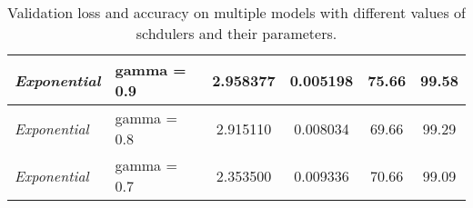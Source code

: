 {\begin{table}[h]
\begin{tabular}{|l|l|cc|cc|}
\textit{Exponential} & gamma = 0.9 & \multicolumn{1}{c|}{2.958377} & 0.005198 & \multicolumn{1}{c|}{75.66} & 99.58 \\ \hline
\textit{Exponential} & gamma = 0.8 & \multicolumn{1}{c|}{2.915110} & 0.008034 & \multicolumn{1}{c|}{69.66} & 99.29 \\ \hline
\textit{Exponential} & gamma = 0.7 & \multicolumn{1}{c|}{2.353500} & 0.009336 & \multicolumn{1}{c|}{70.66} & 99.09 \\ \hline
\end{tabular}
\caption{Validation loss and accuracy on multiple models with different values of schdulers and their parameters.}
\label{tab:schedulerpar}
\end{table}
}
